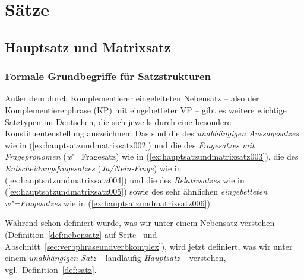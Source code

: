 \chapter{Sätze}
\label{sec:saetze}

\section{Hauptsatz und Matrixsatz}
\label{sec:hauptsatzundmatrixsatz}

\subsection{Formale Grundbegriffe für Satzstrukturen}
\label{sec:formalegrundbegriffefuersatzstrukturen}

Außer dem durch Komplementierer eingeleiteten Nebensatz -- also der Komplementiererphrase (KP) mit eingebetteter VP -- gibt es weitere wichtige Satztypen im Deutschen, die sich jeweils durch eine besondere Konstituentenstellung auszeichnen.
Das sind die des \textit{unabhängigen Aussagesatzes} wie in (\ref{ex:hauptsatzundmatrixsatz002}) und die des \textit{Fragesatzes mit Fragepronomen} (\textit{w}"=Fragesatz) wie in (\ref{ex:hauptsatzundmatrixsatz003}), die des \textit{Entscheidungsfragesatzes} (\textit{Ja\slash Nein-Frage}) wie in (\ref{ex:hauptsatzundmatrixsatz004}) und die des \textit{Relativsatzes} wie in (\ref{ex:hauptsatzundmatrixsatz005}) sowie des sehr ähnlichen \textit{eingebetteten \textit{w}"=Fragesatzes} wie in (\ref{ex:hauptsatzundmatrixsatz006}).

\begin{exe}
  \ex\label{ex:hauptsatzundmatrixsatz001}
  \begin{xlist}
  \end{xlist}
\end{exe}

Während schon definiert wurde, was wir unter einem Nebensatz verstehen (Definition~\ref{def:nebensatz} auf Seite~\pageref{def:nebensatz} und Abschnitt~\ref{sec:verbphraseundverbkomplex}), wird jetzt definiert, was wir unter einem \textit{unabhängigen Satz} -- landläufig \textit{Hauptsatz} -- verstehen, vgl.\ Definition~\ref{def:satz}.


